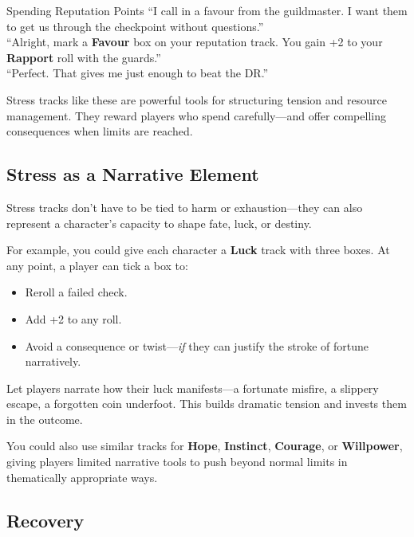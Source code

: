 \begin{ExampleGame}{Spending Reputation Points}
    \line[Player] “I call in a favour from the guildmaster. I want them to get us through the checkpoint without questions.” \\
    \line[GM]     “Alright, mark a \textbf{Favour} box on your reputation track. You gain +2 to your \textbf{Rapport} roll with the guards.” \\
    \line[Player] “Perfect. That gives me just enough to beat the DR.”
\end{ExampleGame}

Stress tracks like these are powerful tools for structuring tension and resource management. They reward players who spend carefully—and offer compelling consequences when limits are reached.

\subsection{Stress as a Narrative Element}

Stress tracks don’t have to be tied to harm or exhaustion—they can also represent a character’s capacity to shape fate, luck, or destiny.

For example, you could give each character a \textbf{Luck} track with three boxes. At any point, a player can tick a box to:
\begin{itemize}
    \item Reroll a failed check.
    \item Add +2 to any roll.
    \item Avoid a consequence or twist—\emph{if} they can justify the stroke of fortune narratively.
\end{itemize}

\begin{GmTips}
    Let players narrate how their luck manifests—a fortunate misfire, a slippery escape, a forgotten coin underfoot. This builds dramatic tension and invests them in the outcome.
\end{GmTips}

You could also use similar tracks for \textbf{Hope}, \textbf{Instinct}, \textbf{Courage}, or \textbf{Willpower}, giving players limited narrative tools to push beyond normal limits in thematically appropriate ways.

\subsection{Recovery}

